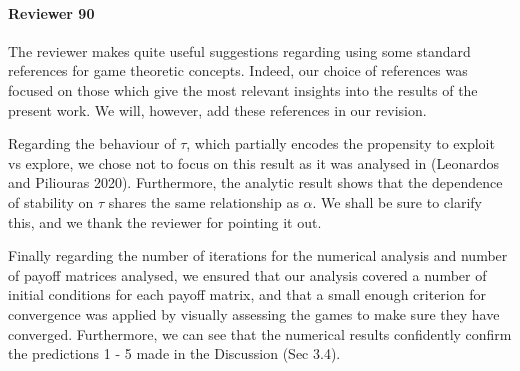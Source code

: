\documentclass{article}
\begin{document}
\paragraph{Reviewer 90} %
\label{par:reviewer_90}

The reviewer makes quite useful suggestions regarding using some standard references for game
theoretic concepts. Indeed, our choice of references was focused on those which give the most
relevant insights into the results of the present work. We will, however, add these references in
our revision.

Regarding the behaviour of $\tau$, which partially encodes the propensity to exploit vs explore, we
chose not to focus on this result as it was analysed in (Leonardos and Piliouras 2020). Furthermore,
the analytic result shows that the dependence of stability on $\tau$ shares the same relationship as
$\alpha$. We shall be sure to clarify this, and we thank the reviewer for pointing it out.

Finally regarding the number of iterations for the numerical analysis and number of payoff matrices
analysed, we ensured that our analysis covered a number of initial conditions for each payoff
matrix, and that a small enough criterion for convergence was applied by visually assessing the
games to make sure they have converged. Furthermore, we can see that the numerical results
confidently confirm the predictions 1 - 5 made in the Discussion (Sec 3.4). 
\end{document}
